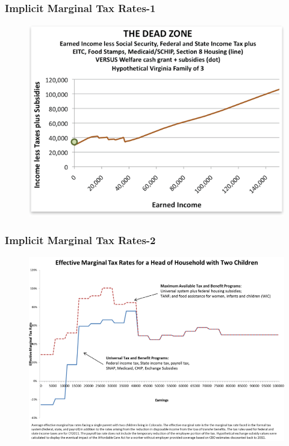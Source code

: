 \documentclass{beamer}
\begin{document}
\begin{frame}
\frametitle[alignment=center]{Implicit Marginal Tax Rates-1}
\begin{figure}
\centering
\includegraphics[scale=0.5]{ITR_1}
\end{figure}
\end{frame}

\begin{frame}
\frametitle[alignment=center]{Implicit Marginal Tax Rates-2}
\begin{figure}
\centering
\includegraphics[scale=0.35]{ITR_2}
\end{figure}
\end{frame}
\end{document}

